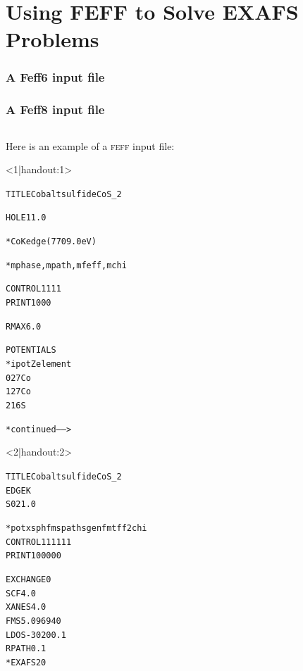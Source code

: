 \documentclass[10pt, xcolor=x11names, compress]{beamer}
\begin{document}
\section[EXAFS]{Using FEFF to Solve EXAFS Problems}

\begin{frame}[fragile]
  \frametitle<1|handout:1>{A Feff6 input file}
  \frametitle<2|handout:2>{A Feff8 input file}
  \begin{columns}[T]
    \begin{column}{0.44\linewidth}
      Here is an example of a \textsc{feff} input file:


      \begin{onlyenv}<1|handout:1>
        \begin{block}{}
          \begin{alltt}
            \tiny
 {\color{Green4}TITLE Cobalt sulfide  CoS\_2}

 {\color{Purple2}HOLE} 1 1.0 {\color{Blue4}*  Co K edge (7709.0 eV)

 *         mphase,mpath,mfeff,mchi}
 {\color{SteelBlue2}CONTROL}   1      1     1     1
 {\color{SteelBlue2}PRINT}     1      0     0     0

 {\color{Purple2}RMAX}        6.0


 {\color{Brown4}POTENTIALS}
 {\color{Blue4}*    ipot   Z  element}
        0   27   Co
        1   27   Co
        2   16   S

                  {\color{Blue4}* continued ------>}
          \end{alltt}
        \end{block}
      \end{onlyenv}
      \begin{onlyenv}<2|handout:2>
        \begin{block}{}
          \begin{alltt}
            \tiny
 {\color{Green4}TITLE Cobalt sulfide  CoS\_2}
 {\color{Purple2}EDGE} K
 {\color{Purple2}S02}  1.0

 {\color{Blue4} *    pot    xsph  fms   paths genfmt ff2chi}
 {\color{SteelBlue2}CONTROL}   1      1     1     1     1     1
 {\color{SteelBlue2}PRINT}     1      0     0     0     0     0

 {\color{Purple2}EXCHANGE}   0
 {\color{Purple2}SCF}        4.0
 {\color{Purple2}XANES}      4.0
 {\color{Purple2}FMS}        5.09694  0
 {\color{Purple2}LDOS}      -30   20     0.1
 {\color{Purple2}RPATH}      0.1
 {\color{Blue4}*EXAFS     20}


\end{alltt}
\end{block}
\end{onlyenv}
\end{column}
\end{columns}
\end{frame}
\end{document}
